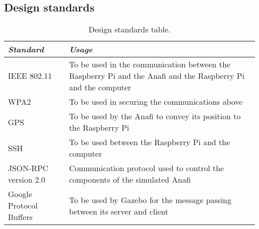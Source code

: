 \documentclass[../main.tex]{subfiles}
\begin{document}
\subsection{Design standards}

\begin{table}[hbt!]
    \centering
    \caption{Design standards table.}
    \label{tab:design-standards}
    \begin{tabular}{ P{2.2cm} P{12.3cm} }
        \toprule
            \textit{Standard} 
                & \textit{Usage}\\

        \midrule
        IEEE 802.11 
                & To be used in the communication between 
                the Raspberry Pi and the Anafi and the 
                Raspberry Pi and the computer \\ 
                \addlinespace
        
        WPA2 
                & To be used in securing the communications above \\
                \addlinespace
        
        
        GPS 
                & To be used by the Anafi to convey its position 
                to the Raspberry Pi \\
                \addlinespace
        
        
        SSH 
                & To be used between the Raspberry Pi and the computer \\
                \addlinespace
        
        
        JSON-RPC version 2.0 
                & Communication protocol used to control the components 
                of the simulated Anafi \\
                \addlinespace
        
        
        Google Protocol Buffers 
                & To be used by Gazebo for the message passing between 
                its server and client \\
        
        \bottomrule
    \end{tabular}
\end{table}




\end{document}
